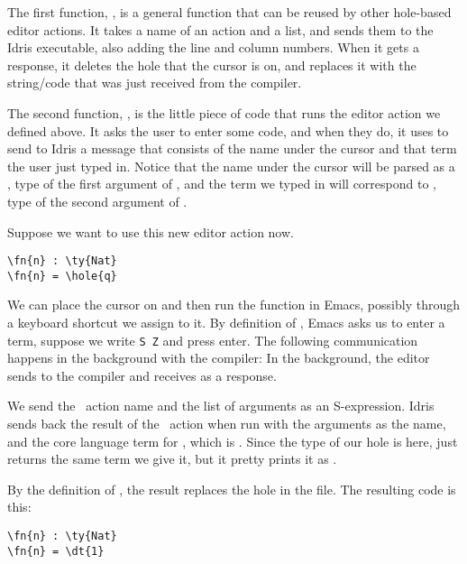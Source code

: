 The first function, , is a general function that can be
reused by other hole-based editor actions. It takes a name of an action and a
list, and sends them to the Idris executable, also adding the line and column
numbers. When it gets a response, it deletes the hole that the cursor is on,
and replaces it with the string/code that was just received from the compiler.

The second function, , is the little piece of code that runs the
 editor action we defined above. It asks the user to enter some code,
and when they do, it uses  to send to Idris a message
that consists of the name under the cursor and that term the user just typed
in. Notice that the name under the cursor will be parsed as a , type
of the first argument of , and the term we typed in will correspond to
\TT, type of the second argument of .

Suppose we want to use this new editor action now.

\begin{Verbatim}
\fn{n} : \ty{Nat}
\fn{n} = \hole{q}
\end{Verbatim}

We can place the cursor on  and then run the  function in
Emacs, possibly through a keyboard shortcut we assign to it.
By definition of , Emacs asks us to enter a term, suppose we
write \texttt{S Z} and press enter.
The following communication happens in the background with the compiler: In the
background, the editor sends  to
the compiler and receives  as a response.

We send the \Elab\ action name  and the list of arguments as an
S-expression. Idris sends back the result of the \Elab\ action when run with
the arguments  as the name, and the core language term for ,
which is . Since the type of our hole is
 here,  just returns the same term we give it, but it pretty
prints it as .

By the definition of , the result  replaces the hole
 in the file. The resulting code is this:

\begin{Verbatim}
\fn{n} : \ty{Nat}
\fn{n} = \dt{1}
\end{Verbatim}

